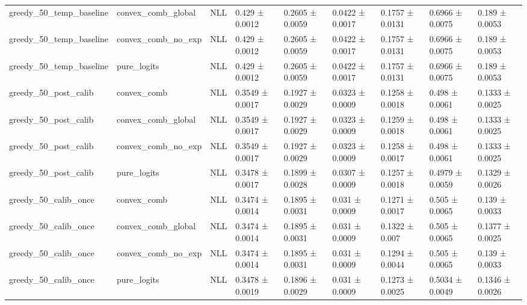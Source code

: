 \begin{tabular}{lllllllll}
greedy_50_temp_baseline & convex_comb_global & NLL & 0.429 ± 0.0012 & 0.2605 ± 0.0059 & 0.0422 ± 0.0017 & 0.1757 ± 0.0131 & 0.6966 ± 0.0075 & 0.189 ± 0.0053 \\
greedy_50_temp_baseline & convex_comb_no_exp & NLL & 0.429 ± 0.0012 & 0.2605 ± 0.0059 & 0.0422 ± 0.0017 & 0.1757 ± 0.0131 & 0.6966 ± 0.0075 & 0.189 ± 0.0053 \\
greedy_50_temp_baseline & pure_logits & NLL & 0.429 ± 0.0012 & 0.2605 ± 0.0059 & 0.0422 ± 0.0017 & 0.1757 ± 0.0131 & 0.6966 ± 0.0075 & 0.189 ± 0.0053 \\
greedy_50_post_calib & convex_comb & NLL & 0.3549 ± 0.0017 & 0.1927 ± 0.0029 & 0.0323 ± 0.0009 & 0.1258 ± 0.0018 & 0.498 ± 0.0061 & 0.1333 ± 0.0025 \\
greedy_50_post_calib & convex_comb_global & NLL & 0.3549 ± 0.0017 & 0.1927 ± 0.0029 & 0.0323 ± 0.0009 & 0.1259 ± 0.0018 & 0.498 ± 0.0061 & 0.1333 ± 0.0025 \\
greedy_50_post_calib & convex_comb_no_exp & NLL & 0.3549 ± 0.0017 & 0.1927 ± 0.0029 & 0.0323 ± 0.0009 & 0.1258 ± 0.0017 & 0.498 ± 0.0061 & 0.1333 ± 0.0025 \\
greedy_50_post_calib & pure_logits & NLL & 0.3478 ± 0.0017 & 0.1899 ± 0.0028 & 0.0307 ± 0.0009 & 0.1257 ± 0.0018 & 0.4979 ± 0.0059 & 0.1329 ± 0.0026 \\
greedy_50_calib_once & convex_comb & NLL & 0.3474 ± 0.0014 & 0.1895 ± 0.0031 & 0.031 ± 0.0009 & 0.1271 ± 0.0017 & 0.505 ± 0.0065 & 0.139 ± 0.0033 \\
greedy_50_calib_once & convex_comb_global & NLL & 0.3474 ± 0.0014 & 0.1895 ± 0.0031 & 0.031 ± 0.0009 & 0.1322 ± 0.007 & 0.505 ± 0.0065 & 0.1377 ± 0.0025 \\
greedy_50_calib_once & convex_comb_no_exp & NLL & 0.3474 ± 0.0014 & 0.1895 ± 0.0031 & 0.031 ± 0.0009 & 0.1294 ± 0.0044 & 0.505 ± 0.0065 & 0.139 ± 0.0033 \\
greedy_50_calib_once & pure_logits & NLL & 0.3478 ± 0.0019 & 0.1896 ± 0.0029 & 0.031 ± 0.0009 & 0.1273 ± 0.0025 & 0.5034 ± 0.0049 & 0.1346 ± 0.0026 \\
\bottomrule
\end{tabular}

